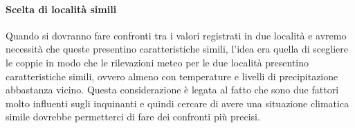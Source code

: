 \documentclass{article}
\begin{document}
\paragraph{Scelta di località simili}
Quando si dovranno fare confronti tra i valori registrati in due località e avremo necessità che queste presentino caratteristiche simili, l'idea era quella di scegliere le coppie in modo che le rilevazioni meteo per le due località presentino caratteristiche simili, ovvero almeno con temperature e livelli di precipitazione abbastanza vicino. Questa considerazione è legata al fatto che sono due fattori molto influenti sugli inquinanti e quindi cercare di avere una situazione climatica simile dovrebbe permetterci di fare dei confronti più precisi.
\newpage



\end{document}
